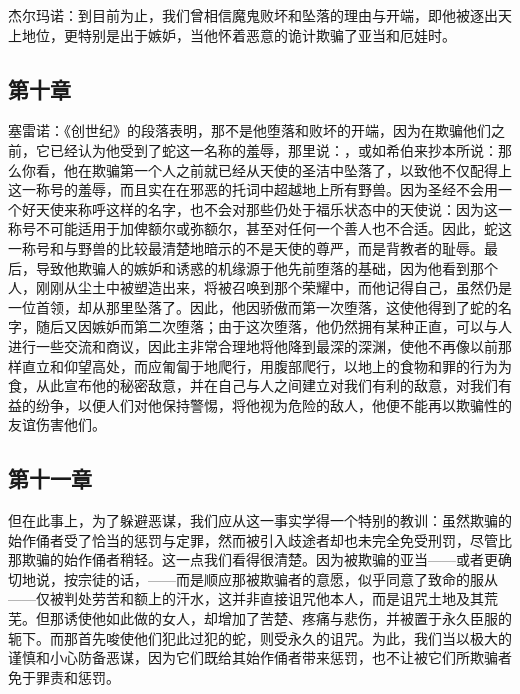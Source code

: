 杰尔玛诺：到目前为止，我们曾相信魔鬼败坏和坠落的理由与开端，即他被逐出天上地位，更特别是出于嫉妒，当他怀着恶意的诡计欺骗了亚当和厄娃时。\par


\subsection{第十章}

\par

塞雷诺：《创世纪》的段落表明，那不是他堕落和败坏的开端，因为在欺骗他们之前，它已经认为他受到了蛇这一名称的羞辱，那里说：，或如希伯来抄本所说：那么你看，他在欺骗第一个人之前就已经从天使的圣洁中坠落了，以致他不仅配得上这一称号的羞辱，而且实在在邪恶的托词中超越地上所有野兽。因为圣经不会用一个好天使来称呼这样的名字，也不会对那些仍处于福乐状态中的天使说：因为这一称号不可能适用于加俾额尔或弥额尔，甚至对任何一个善人也不合适。因此，蛇这一称号和与野兽的比较最清楚地暗示的不是天使的尊严，而是背教者的耻辱。最后，导致他欺骗人的嫉妒和诱惑的机缘源于他先前堕落的基础，因为他看到那个人，刚刚从尘土中被塑造出来，将被召唤到那个荣耀中，而他记得自己，虽然仍是一位首领，却从那里坠落了。因此，他因骄傲而第一次堕落，这使他得到了蛇的名字，随后又因嫉妒而第二次堕落；由于这次堕落，他仍然拥有某种正直，可以与人进行一些交流和商议，因此主非常合理地将他降到最深的深渊，使他不再像以前那样直立和仰望高处，而应匍匐于地爬行，用腹部爬行，以地上的食物和罪的行为为食，从此宣布他的秘密敌意，并在自己与人之间建立对我们有利的敌意，对我们有益的纷争，以便人们对他保持警惕，将他视为危险的敌人，他便不能再以欺骗性的友谊伤害他们。\par


\subsection{第十一章}

\par

但在此事上，为了躲避恶谋，我们应从这一事实学得一个特别的教训：虽然欺骗的始作俑者受了恰当的惩罚与定罪，然而被引入歧途者却也未完全免受刑罚，尽管比那欺骗的始作俑者稍轻。这一点我们看得很清楚。因为被欺骗的亚当——或者更确切地说，按宗徒的话，——而是顺应那被欺骗者的意愿，似乎同意了致命的服从——仅被判处劳苦和额上的汗水，这并非直接诅咒他本人，而是诅咒土地及其荒芜。但那诱使他如此做的女人，却增加了苦楚、疼痛与悲伤，并被置于永久臣服的轭下。而那首先唆使他们犯此过犯的蛇，则受永久的诅咒。为此，我们当以极大的谨慎和小心防备恶谋，因为它们既给其始作俑者带来惩罚，也不让被它们所欺骗者免于罪责和惩罚。\par

